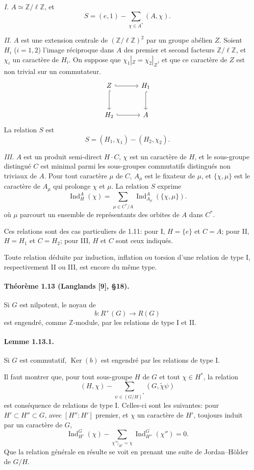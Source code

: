 \documentclass[10pt]{article}
\newcommand{\Z}{\mathbb Z}
\newcommand{\Ind}{\operatorname{Ind}}
\providecommand{\Ker}{\operatorname{Ker}}
\providecommand{\Ind}{\operatorname{Ind}}
\providecommand{\Ker}{\operatorname{Ker}}
\begin{document}
\emph{I.} \(A\simeq\Z/\ell\Z\), et
\[
S=(e,1)-\sum_{\chi\in A^*}(A,\chi).
\]

\emph{II.} \(A\) est une extension centrale de \((\Z/\ell\Z)^2\) par un groupe abélien \(Z\). Soient \(H_i\) (\(i=1,2\)) l'image réciproque dans \(A\) des premier et second facteurs \(\Z/\ell\Z\), et \(\chi_i\) un caractère de \(H_i\). On suppose que \(\chi_1|_Z=\chi_2|_Z\), et que ce caractère de \(Z\) est non trivial sur un commutateur.
\[
\begin{tikzcd}[column sep=3.2em,row sep=2.7em]
Z \arrow[r,hook] \arrow[d,hook] & H_1 \arrow[d,hook]\\
H_2 \arrow[r,hook] & A
\end{tikzcd}
\]
La relation \(S\) est
\[
S=(H_1,\chi_1)-(H_2,\chi_2).
\]

\emph{III.} \(A\) est un produit semi-direct \(H\cdot C\), \(\chi\) est un caractère de \(H\), et le sous-groupe distingué \(C\) est minimal parmi les sous-groupes commutatifs distingués non triviaux de \(A\). Pour tout caractère \(\mu\) de \(C\), \(A_\mu\) est le fixateur de \(\mu\), et \(\{\chi,\mu\}\) est le caractère de \(A_\mu\) qui prolonge \(\chi\) et \(\mu\). La relation \(S\) exprime
\[
\Ind_H^A(\chi)=
\sum_{\mu\in C^*/A}
\Ind_{A_\mu}^A(\{\chi,\mu\}).
\]
où \(\mu\) parcourt un ensemble de représentants des orbites de \(A\) dans \(C^*\).

Ces relations sont des cas particuliers de 1.11: pour I, \(H=\{e\}\) et \(C=A\); pour II, \(H=H_1\) et \(C=H_2\); pour III, \(H\) et \(C\) sont ceux indiqués.

Toute relation déduite par induction, inflation ou torsion d'une relation de type I, respectivement II ou III, est encore du même type.

\paragraph{Théorème 1.13 (Langlands [9], §18).} Si \(G\) est nilpotent, le noyau de
\[
b:R^+(G)\longrightarrow R(G)
\]
est engendré, comme \(\Z\)-module, par les relations de type I et II.

\paragraph{Lemme 1.13.1.} Si \(G\) est commutatif, \(\Ker(b)\) est engendré par les relations de type I.

Il faut montrer que, pour tout sous-groupe \(H\) de \(G\) et tout \(\chi\in H^*\), la relation
\[
(H,\chi)-\sum_{\psi\in (G/H)^*}(G,\tilde\chi\psi)
\]
est conséquence de relations de type I. Celles-ci sont les suivantes: pour \(H'\subset H''\subset G\), avec \([H'':H']\) premier, et \(\chi\) un caractère de \(H'\), toujours induit par un caractère de \(G\),
\[
\Ind_{H'}^G(\chi)-\sum_{\chi''|_{H'}=\chi}\Ind_{H''}^G(\chi'')=0.
\]
Que la relation générale en résulte se voit en prenant une suite de Jordan--Hölder de \(G/H\).
\end{document}
